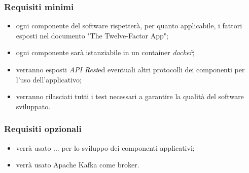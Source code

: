 		\subsubsection{Requisiti minimi}
            \begin{itemize}
                \item ogni componente del software rispetterà, per quanto applicabile, i fattori esposti nel documento "The Twelve-Factor App";
                \item ogni componente sarà istanziabile in un container \textit{docker}\G;
                \item verranno esposti \textit{API Rest}\GAlt ed eventuali altri protocolli dei componenti per l'uso dell'applicativo;
                \item verranno rilasciati tutti i test necessari a garantire la qualità del software sviluppato.
            \end{itemize}
	
		\subsubsection{Requisiti opzionali}
		    \begin{itemize}
                \item verrà usato ... per lo sviluppo dei componenti applicativi;
                \item verrà usato Apache Kafka come broker.
            \end{itemize}